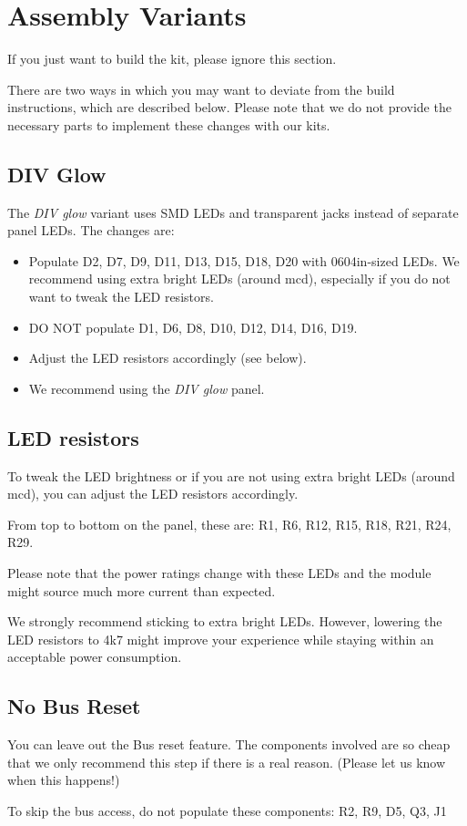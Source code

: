 \documentclass[a4paper,
               11pt,
               parskip=half,
               headinclude,
               titlepage=false]{scrartcl}
\begin{document}
\newpage



\section*{Assembly Variants}

If you just want to build the kit, please ignore this section.

There are two ways in which you may want to deviate from the build instructions, which are described below.
Please note that we do not provide the necessary parts to implement these changes with our kits. 

\subsection*{DIV Glow}

The \emph{DIV glow} variant uses SMD LEDs and transparent jacks instead of separate panel LEDs. The changes are:
\begin{itemize}[noitemsep]
 \item Populate D2, D7, D9, D11, D13, D15, D18, D20 with 0604in-sized LEDs. We recommend using extra bright LEDs (around \unit[200]{mcd}), especially if you do not want to tweak the LED resistors. 
 \item DO NOT populate D1, D6, D8, D10, D12, D14, D16, D19.
 \item Adjust the LED resistors accordingly (see below).
 \item We recommend using the \emph{DIV glow} panel.
\end{itemize}

\subsection*{LED resistors}

To tweak the LED brightness or if you are not using extra bright LEDs (around \unit[200]{mcd}), you can adjust the LED resistors accordingly.

From top to bottom on the panel, these are: R1, R6, R12, R15, R18, R21, R24, R29.

Please note that the power ratings change with these LEDs and the module might source much more current than expected.

We strongly recommend sticking to extra bright LEDs. However, lowering the LED resistors to 4k7 might improve your experience while staying within an acceptable power consumption.

\subsection*{No Bus Reset}

You can leave out the Bus reset feature. The components involved are so cheap that we only recommend this step if there is a real reason. (Please let us know when this happens!)

To skip the bus access, do not populate these components: R2, R9, D5, Q3, J1
\end{document}
